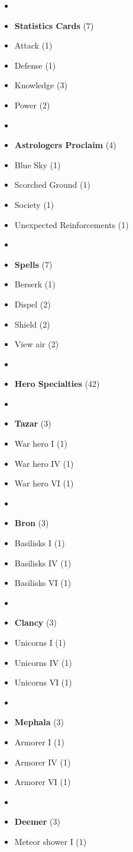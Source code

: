 \begin{multicols}{3}
\begin{itemize}[leftmargin=0pt, label={}, noitemsep, noitemsep]
  \item
  \item \textbf{Statistics Cards} (7)
  \item Attack (1)
  \item Defense (1)
  \item Knowledge (3)
  \item Power (2)
  \item
  \item \textbf{Astrologers Proclaim} (4)
  \item Blue Sky (1)
  \item Scorched Ground (1)
  \item Society (1)
  \item Unexpected Reinforcements (1)
  \item
  \item \textbf{Spells} (7)
  \item Berserk (1)
  \item Dispel (2)
  \item Shield (2)
  \item View air (2)
  \item
  \item \textbf{Hero Specialties} (42)
  \item
  \item \textbf{Tazar} (3)
  \item War hero I (1)
  \item War hero IV (1)
  \item War hero VI (1)
  \item
  \item \textbf{Bron} (3)
  \item Basilisks I (1)
  \item Basilisks IV (1)
  \item Basilisks VI (1)
  \item
  \item \textbf{Clancy} (3)
  \item Unicorns I (1)
  \item Unicorns IV (1)
  \item Unicorns VI (1)
  \item
  \item \textbf{Mephala} (3)
  \item Armorer I (1)
  \item Armorer IV (1)
  \item Armorer VI (1)
  \item
  \item \textbf{Deemer} (3)
  \item Meteor shower I (1)

\end{itemize}
\end{multicols}
